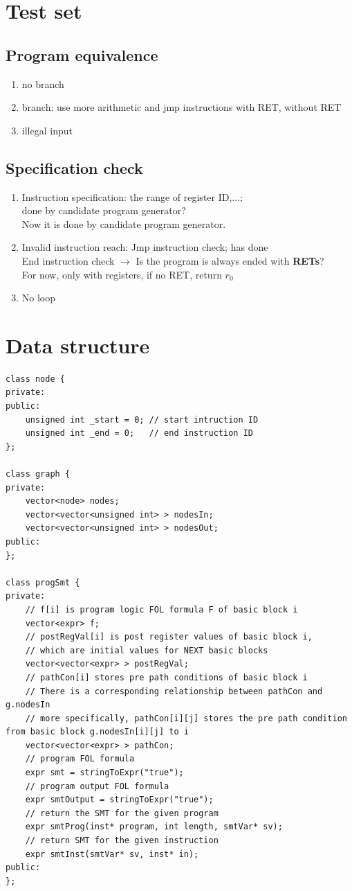\documentclass{article}
\begin{document}
\section{Test set}
\subsection{Program equivalence}
\begin{enumerate}
\item no branch
\item branch: use more arithmetic and jmp instructions
\subitem with RET,
\subitem without RET
\item illegal input
\end{enumerate}
\subsection{Specification check}

\begin{enumerate}
\item Instruction specification: the range of register ID,...; \\done by candidate program generator?\\
Now it is done by candidate program generator.
\item Invalid instruction reach: Jmp instruction check; has done\\
End instruction check  $\rightarrow$ Is the program is always ended with \textbf{RETs}? \\
For now, only with registers, if no RET, return $r_0$
\item No loop
\end{enumerate}

\section{Data structure}
\begin{lstlisting}[caption={}]
class node {
private:
public:
	unsigned int _start = 0; // start intruction ID
	unsigned int _end = 0;   // end instruction ID
};

class graph {
private:
	vector<node> nodes;
	vector<vector<unsigned int> > nodesIn;
	vector<vector<unsigned int> > nodesOut;
public:
};

class progSmt {
private:
	// f[i] is program logic FOL formula F of basic block i
	vector<expr> f;
	// postRegVal[i] is post register values of basic block i,
	// which are initial values for NEXT basic blocks
	vector<vector<expr> > postRegVal;
	// pathCon[i] stores pre path conditions of basic block i
	// There is a corresponding relationship between pathCon and g.nodesIn
	// more specifically, pathCon[i][j] stores the pre path condition from basic block g.nodesIn[i][j] to i
	vector<vector<expr> > pathCon;
	// program FOL formula
	expr smt = stringToExpr("true");
	// program output FOL formula
	expr smtOutput = stringToExpr("true");
	// return the SMT for the given program
	expr smtProg(inst* program, int length, smtVar* sv);
	// return SMT for the given instruction
	expr smtInst(smtVar* sv, inst* in);
public:
};
\end{lstlisting}
\end{document}

